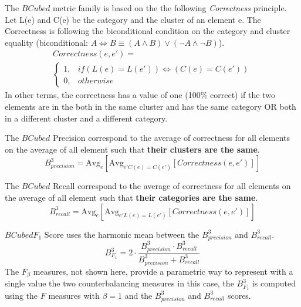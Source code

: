 \begin{definition}
  The $BCubed$ metric family is based on the the following \textit{Correctness} principle.
  Let L(e) and C(e) be the category and the cluster of an element e.
  The Correctness is following the biconditional condition on the category and cluster equality (biconditional: $A \Longleftrightarrow B \equiv (A \land B) \lor (\neg A \land \neg B)$).
  \begin{gather*}
    Correctness(e, e') = \\
    \begin{cases}
      1, & if (L(e) = L(e')) \Longleftrightarrow (C(e) = C(e'))\\
      0, & otherwise
    \end{cases}
  \end{gather*}
  In other terms, the correctness has a value of one (100\% correct) if the two elements are in the both in the same cluster and has the same category OR both in a different cluster and a different category.
\end{definition}

\begin{definition}
  The $BCubed$ Precision correspond to the average of correctness for all elements on the average of all element such that \textbf{their clusters are the same}.
  \begin{equation}
    B^3_{precision} = \text{Avg}_{e}[\text{Avg}_{e' C(e)=C(e')}[Correctness(e, e')]]
  \end{equation}
\end{definition}

\begin{definition}
  The $BCubed$ Recall correspond to the average of correctness for all elements on the average of all element such that \textbf{their categories are the same}.
  \begin{equation}
    B^3_{recall} = \text{Avg}_{e}[\text{Avg}_{e' L(e)=L(e')}[Correctness(e, e')]]
  \end{equation}
\end{definition}

\begin{definition}
  $BCubed F_1$ Score uses the harmonic mean between the $B^3_{precision}$ and $B^3_{recall}$.
  \begin{equation}
    B^3_{F_1} =
    2 \cdot \frac{B^3_{precision} \cdot B^3_{recall}}
    {B^3_{precision} + B^3_{recall}}
  \end{equation}
  The $F_\beta$ measures, not shown here, provide a parametric way to represent with a single value the two counterbalancing measures in this case, the $B^3_{F_1}$ is computed using the $F$ measures with $\beta = 1$ and the $B^3_{precision}$ and $B^3_{recall}$ scores.
\end{definition}

